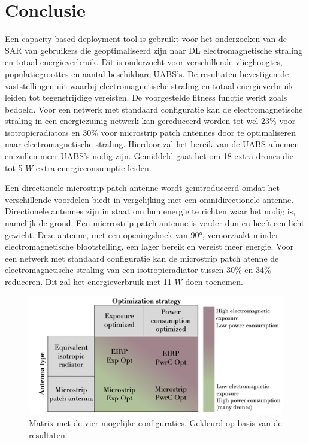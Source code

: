 \documentclass[twocolumn]{phdsymp_dutch}
\begin{document}
\section{Conclusie}

Een capacity-based deployment tool is gebruikt voor het onderzoeken van de 
\gls{SAR} van gebruikers die geoptimaliseerd zijn naar 
 \gls{DL} electromagnetische straling en totaal energieverbruik.
 Dit is onderzocht voor verschillende vlieghoogtes, populatiegroottes en aantal beschikbare \gls{UABS}'s.
De resultaten bevestigen de vaststellingen uit \cite{J1}  waarbij electromagnetische straling en totaal energieverbruik
leiden tot tegenstrijdige vereisten. De voorgestelde fitness functie werkt zoals bedoeld.
Voor een netwerk met standaard configuratie kan de electromagnetische straling in een 
energiezuinig netwerk kan gereduceerd worden tot wel 
23\% voor \gls{isotropicradiator}s en 30\% voor microstrip patch antennes
door te optimaliseren naar electromagnetische straling. Hierdoor zal het bereik van de 
 \gls{UABS} afnemen en zullen meer \gls{UABS}'s nodig zijn.
Gemiddeld gaat het om 18 extra drones die tot 5 $W$  extra energieconsumptie leiden.

Een directionele microstrip patch antenne wordt geïntroduceerd omdat het verschillende voordelen biedt 
in vergelijking met een omnidirectionele antenne. Directionele antennes zijn in staat om hun energie te richten waar het nodig is, namelijk de grond.
Een micrrostrip patch antenne is verder dun en heeft een licht gewicht. Deze antenne, met een openingshoek van \ang{90}, veroorzaakt 
minder electromagnetische blootstelling, een lager bereik en vereist meer energie.
Voor een netwerk met standaard configuratie kan de microstrip patch atenne de electromagnetische
straling van een \gls{isotropicradiator} tussen 30\% en 34\% reduceren. Dit zal het energieverbruik met 11 $W$ doen toenemen.
\begin{figure}[hb!]
\centering
  \includegraphics[width=0.8\linewidth]{../images/fourCasesMatrixSol.png}
  \caption{Matrix met de vier mogelijke configuraties. Gekleurd op basis van de resultaten.}
  \label{fig:resultIllustration}
\end{figure}
\end{document}
